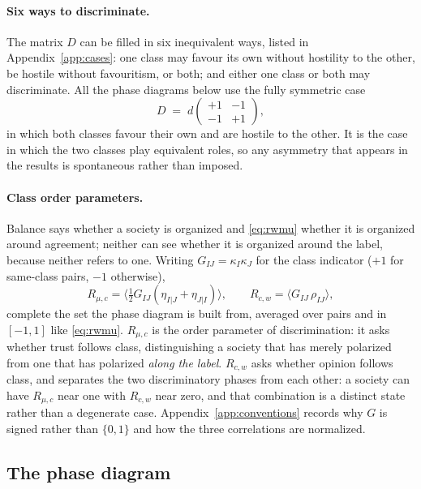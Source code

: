 \documentclass{article}
\newcommand{\Rmuc}{R_{\mu,c}}
\newcommand{\Rcw}{R_{c,w}}
\begin{document}
\paragraph{Six ways to discriminate.} The matrix $D$ can be filled in six
inequivalent ways, listed in Appendix~\ref{app:cases}: one class may favour its
own without hostility to the other, be hostile without favouritism, or both; and
either one class or both may discriminate. All the phase diagrams below use the
fully symmetric case
%
\begin{equation}
  D \;=\; d\begin{pmatrix} +1 & -1\\ -1 & +1\end{pmatrix},
  \label{eq:case6}
\end{equation}
%
in which both classes favour their own and are hostile to the other. It is the
case in which the two classes play equivalent roles, so any asymmetry that
appears in the results is spontaneous rather than imposed.

\paragraph{Class order parameters.} Balance says whether a society is organized
and \eqref{eq:rwmu} whether it is organized around agreement; neither can see whether
it is organized around the label, because neither refers to one. Writing
$G_{IJ}=\kappa_I\kappa_J$ for the class indicator ($+1$ for same-class pairs, $-1$
otherwise),
%
\begin{equation}
  \Rmuc = \bigl\langle \tfrac{1}{2}G_{IJ}(\eta_{I|J}+\eta_{J|I}) \bigr\rangle,
  \qquad
  \Rcw  = \bigl\langle G_{IJ}\,\rho_{IJ} \bigr\rangle,
  \label{eq:correlations}
\end{equation}
%
complete the set the phase diagram is built from, averaged over pairs and in
$[-1,1]$ like \eqref{eq:rwmu}. $\Rmuc$ is the order
parameter of discrimination: it asks whether trust follows class, distinguishing a
society that has merely polarized from one that has polarized \emph{along the
label}. $\Rcw$ asks whether opinion follows class, and separates the two
discriminatory phases from each other: a society can have $\Rmuc$ near one with
$\Rcw$ near zero, and that combination is a distinct state rather than a degenerate
case. Appendix~\ref{app:conventions} records why $G$ is signed rather than
$\{0,1\}$ and how the three correlations are normalized.

\subsection{The phase diagram}
\label{sec:results}
\end{document}
